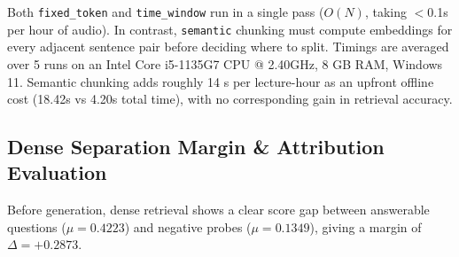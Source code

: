 \documentclass[conference]{IEEEtran}
\begin{document}
Both \texttt{fixed\_token} and \texttt{time\_window} run in a single pass ($O(N)$, taking $<$0.1s per hour of audio). In contrast, \texttt{semantic} chunking must compute embeddings for every adjacent sentence pair before deciding where to split. Timings are averaged over 5 runs on an Intel Core i5-1135G7 CPU @ 2.40GHz, 8 GB RAM, Windows 11. Semantic chunking adds roughly 14 s per lecture-hour as an upfront offline cost (18.42s vs 4.20s total time), with no corresponding gain in retrieval accuracy.

\begin{table}[htbp]
\caption{Computational Indexing Overhead and Processing Throughput Across Chunking Strategies (Per Hour of Lecture Audio)}
\label{tab:computational_overhead}
\centering
{}
\end{table}

\subsection{Dense Separation Margin \& Attribution Evaluation}
\label{sec:separation_and_faithfulness}
Before generation, dense retrieval shows a clear score gap between answerable questions ($\mu = 0.4223$) and negative probes ($\mu = 0.1349$), giving a margin of $\Delta = +0.2873$. 
\end{document}
